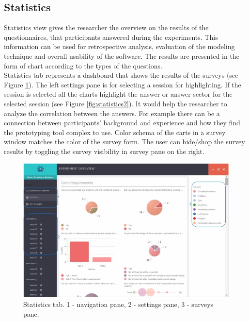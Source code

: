 \subsection{Statistics}

Statistics view gives the researcher the overview on the results of the questionnaires, that participants answered during the experiments. This information can be used for retrospective analysis, evaluation of the modeling technique and overall usability of the software. The results are presented in the form of chart according to the types of the questions.\\

Statistics tab represents a dashboard that shows the results of the surveys (see Figure \ref{fig:statistics}). The left settings pane is for selecting a session for highlighting. If the session is selected all the charts highlight the answer or answer sector for the selected session (see Figure \ref{fig:statistics2}). It would help the researcher to analyze the correlation between the answers. For example there can be a connection between participants' background and experience and how they find the prototyping tool complex to use. Color schema of the carts in a survey window matches the color of the survey form. The user can hide/shop the survey results by toggling the survey visibility in survey pane on the right.\\  

  \begin{figure}[htb]
 \centering
\includegraphics[width=\textwidth]{figures/statistics.jpg}
\caption{Statistics tab. 1 - navigation pane, 2 - settings pane, 3 - surveys pane.}
\label{fig:statistics}
 \end{figure}
 
